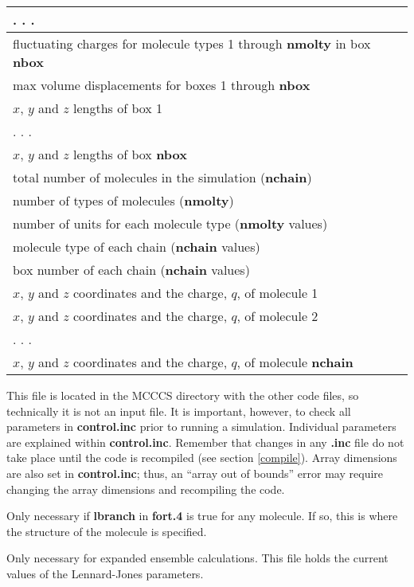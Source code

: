 \documentclass[12pt,letterpaper]{article}
\begin{document}
{{{{{{{\begin{center}
\begin{tabular}{| l |}
  . . . \\ \hline
fluctuating charges for molecule types 1 through {\bf nmolty} in box {\bf nbox} \\ \hline
max volume displacements for boxes 1 through {\bf nbox} \\ \hline
$x$, $y$ and $z$ lengths of box 1  \\ \hline
  . . . \\ \hline
$x$, $y$ and $z$ lengths of box {\bf nbox} \\ \hline
total number of molecules in the simulation ({\bf nchain}) \\ \hline
number of types of molecules ({\bf nmolty}) \\ \hline
number of units for each molecule type ({\bf nmolty} values) \\ \hline
molecule type of each chain ({\bf nchain} values) \\ \hline
box number of each chain ({\bf nchain} values) \\ \hline
$x$, $y$ and $z$ coordinates and the charge, $q$, of molecule 1 \\ \hline
$x$, $y$ and $z$ coordinates and the charge, $q$, of molecule 2 \\ \hline
  . . . \\ \hline
$x$, $y$ and $z$ coordinates and the charge, $q$, of molecule {\bf nchain} \\ 
  \hline
\end{tabular}
\end{center}

This file is located in the MCCCS directory with the other code files, so technically it is not an input file.    
It is important, however, to check all parameters in {\bf control.inc} prior to running a simulation.  
Individual parameters are explained within {\bf control.inc}.
Remember that changes in any {\bf .inc} file do not take place until the code is recompiled (see section \ref{compile}).
Array dimensions are also set in {\bf control.inc}; thus, an ``array out of bounds'' error may require changing the array dimensions and recompiling the code.

Only necessary if {\bf lbranch} in {\textbf{fort.4}} is true for any molecule.  If so, this is where the structure of the molecule is specified.  

Only necessary for expanded ensemble calculations. 
This file holds the current values of the Lennard-Jones parameters.

}}}}}}}
\end{document}
